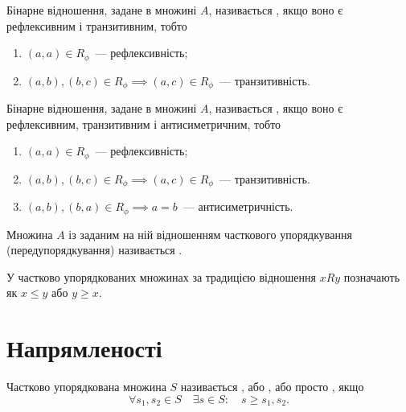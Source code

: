 \begin{definition}
    Бінарне відношення, задане в множині $A$, називається , якщо воно є рефлексивним і транзитивним, тобто
    \begin{enumerate}
        \item $(a, a) \in R_\phi$~--- рефлексивність;
        \item $(a, b), (b, c) \in R_\phi \implies (a, c) \in R_\phi$~--- транзитивність.
    \end{enumerate}
\end{definition}

\begin{definition}
    Бінарне відношення, задане в множині $A$, називається , якщо воно є рефлексивним, транзитивним і антисиметричним, тобто
    \begin{enumerate}
        \item $(a, a) \in R_\phi$~--- рефлексивність;
        \item $(a, b), (b, c) \in R_\phi \implies (a, c) \in R_\phi$~--- транзитивність.
        \item $(a, b), (b, a) \in R_\phi \implies a = b$~--- антисиметричність.
    \end{enumerate}
\end{definition}

\begin{definition}
    Множина $A$ із заданим на ній відношенням часткового упорядкування (передупорядкування) називається .
\end{definition}

\begin{remark}
    У частково упорядкованих множинах за традицією відношення $x R y$ позначають як $x \le y$ або $y \ge x$.
\end{remark}

\section{Напрямленості}

\begin{definition}
    Частково упорядкована множина $S$ називається , або , або просто , якщо
    \begin{equation*}
        \forall s_1, s_2 \in S \quad \exists s \in S: \quad s \ge s_1, s_2.
    \end{equation*}
\end{definition}

